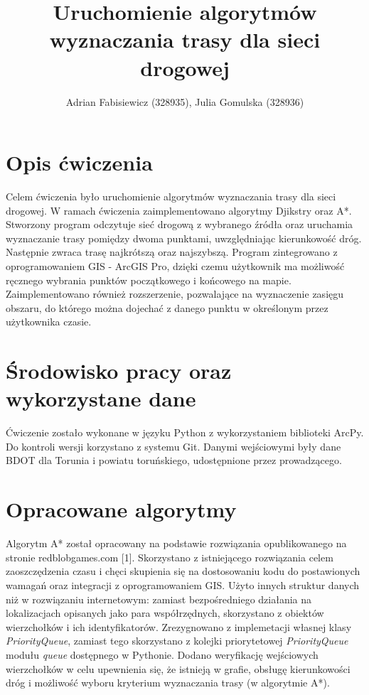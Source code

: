 \documentclass{article}
\title{Uruchomienie algorytmów wyznaczania trasy dla sieci drogowej}
\author{Adrian Fabisiewicz (328935), Julia Gomulska (328936)}
\begin{document}
\maketitle
\renewcommand{\labelenumii}{\arabic{enumi}.\arabic{enumii}}
\renewcommand{\labelenumiii}{\arabic{enumi}.\arabic{enumii}.\arabic{enumiii}}
\renewcommand{\labelenumiv}{\arabic{enumi}.\arabic{enumii}.\arabic{enumiii}.\arabic{enumiv}}

\section{Opis ćwiczenia}

Celem ćwiczenia było uruchomienie algorytmów wyznaczania trasy dla sieci drogowej. W ramach ćwiczenia zaimplementowano algorytmy Djikstry oraz A*. Stworzony program odczytuje sieć drogową z wybranego źródła oraz uruchamia wyznaczanie trasy pomiędzy dwoma punktami, uwzględniając kierunkowość dróg. Następnie zwraca trasę najkrótszą oraz najszybszą. Program zintegrowano z oprogramowaniem GIS - ArcGIS Pro, dzięki czemu użytkownik ma możliwość ręcznego wybrania punktów początkowego i końcowego na mapie. Zaimplementowano również rozszerzenie, pozwalające na wyznaczenie zasięgu obszaru, do którego można dojechać z danego punktu w określonym przez użytkownika czasie.

\section{Środowisko pracy oraz wykorzystane dane}
Ćwiczenie zostało wykonane w języku Python z wykorzystaniem biblioteki ArcPy. Do kontroli wersji korzystano z systemu Git. Danymi wejściowymi były dane BDOT dla Torunia i powiatu toruńskiego, udostępnione przez prowadzącego.

\section{Opracowane algorytmy}
Algorytm A* został opracowany na podstawie rozwiązania opublikowanego na stronie redblobgames.com [1].
Skorzystano z istniejącego rozwiązania celem zaoszczędzenia czasu i chęci skupienia się na dostosowaniu kodu do postawionych wamagań oraz integracji z oprogramowaniem GIS.
Użyto innych struktur danych niż w rozwiązaniu internetowym: zamiast bezpośredniego działania na lokalizacjach opisanych jako para współrzędnych, skorzystano z obiektów wierzchołków i ich identyfikatorów.
Zrezygnowano z implemetacji własnej klasy \textit{PriorityQueue}, zamiast tego skorzystano z kolejki priorytetowej \textit{PriorityQueue} modułu \textit{queue} dostępnego w Pythonie.
Dodano weryfikację wejściowych wierzchołków w celu upewnienia się, że istnieją w grafie, obsługę kierunkowości dróg i możliwość wyboru kryterium wyznaczania trasy (w algorytmie A*). 
\end{document}
